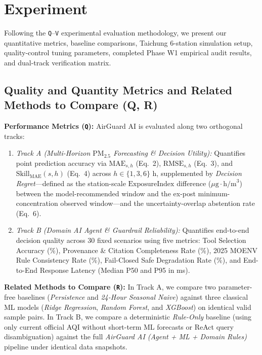 \section{Experiment}

Following the \texttt{Q}--\texttt{V} experimental evaluation methodology, we present our quantitative metrics, baseline comparisons, Taichung 6-station simulation setup, quality-control tuning parameters, completed Phase W1 empirical audit results, and dual-track verification matrix.

\subsection{Quality and Quantity Metrics and Related Methods to Compare (Q, R)}
\textbf{Performance Metrics (\texttt{Q}):} AirGuard AI is evaluated along two orthogonal tracks:
\begin{enumerate}
    \item \emph{Track A (Multi-Horizon $\text{PM}_{2.5}$ Forecasting \& Decision Utility):} Quantifies point prediction accuracy via $\text{MAE}_{s,h}$ (Eq.~2), $\text{RMSE}_{s,h}$ (Eq.~3), and $\text{Skill}_{\text{MAE}}(s,h)$ (Eq.~4) across $h \in \{1, 3, 6\}\text{ h}$, supplemented by \emph{Decision Regret}---defined as the station-scale $\text{ExposureIndex}$ difference ($\mu\text{g}\cdot\text{h/m}^3$) between the model-recommended window and the ex-post minimum-concentration observed window---and the uncertainty-overlap abstention rate (Eq.~6).
    \item \emph{Track B (Domain AI Agent \& Guardrail Reliability):} Quantifies end-to-end decision quality across 30 fixed scenarios using five metrics: Tool Selection Accuracy (\%), Provenance \& Citation Completeness Rate (\%), 2025 MOENV Rule Consistency Rate (\%), Fail-Closed Safe Degradation Rate (\%), and End-to-End Response Latency (Median P50 and P95 in ms).
\end{enumerate}

\textbf{Related Methods to Compare (\texttt{R}):} In Track A, we compare two parameter-free baselines (\emph{Persistence} and \emph{24-Hour Seasonal Naive}) against three classical ML models (\emph{Ridge Regression}, \emph{Random Forest}, and \emph{XGBoost}) on identical valid sample pairs. In Track B, we compare a deterministic \emph{Rule-Only} baseline (using only current official AQI without short-term ML forecasts or ReAct query disambiguation) against the full \emph{AirGuard AI (Agent + ML + Domain Rules)} pipeline under identical data snapshots.

